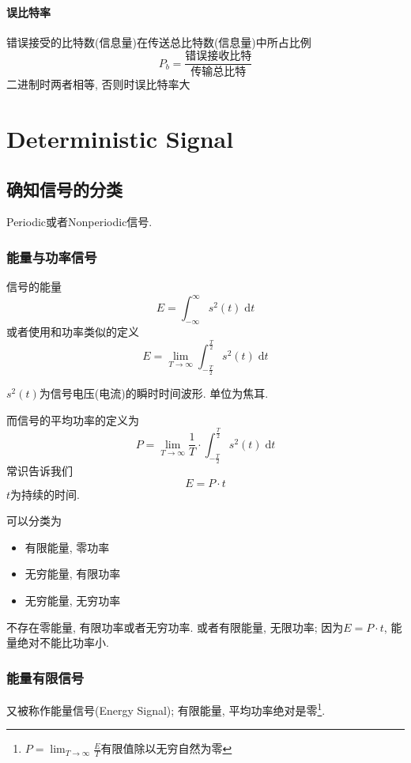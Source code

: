 \documentclass[a4paper]{report}
\begin{document}
\subsubsection{误比特率}
错误接受的比特数(信息量)在传送总比特数(信息量)中所占比例
\begin{equation}
  P_b=\frac{\text{错误接收比特}}{\text{传输总比特}}
\end{equation}
二进制时两者相等, 否则时误比特率大
\chapter{Deterministic Signal}

\section{确知信号的分类}
Periodic或者Nonperiodic信号. 

\subsection{能量与功率信号}
信号的能量
\begin{equation}
  E=\int_{-\infty}^\infty s^2(t)\;\text{d}t
\end{equation}
或者使用和功率类似的定义
\begin{equation}
  E=\lim_{T\rightarrow \infty}\int_{-\frac{T}{2}}^{\frac{T}{2}} s^2(t)\;\text{d}t
\end{equation}

$s^2(t)$为信号电压(电流)的瞬时时间波形. 单位为焦耳. 

而信号的平均功率的定义为
\begin{equation}
  P=\lim_{T\rightarrow \infty}\frac{1}{T}\cdot\int_{-\frac{T}{2}}^{\frac{T}{2}} s^2(t)\;\text{d}t
\end{equation}
常识告诉我们
\begin{equation}
  E=P\cdot t
\end{equation}
$t$为持续的时间. 

可以分类为
\begin{itemize}
  \item 有限能量, 零功率
  \item 无穷能量, 有限功率
  \item 无穷能量, 无穷功率
\end{itemize}
不存在零能量, 有限功率或者无穷功率. 或者有限能量, 无限功率; 因为$E=P\cdot t$, 能量绝对不能比功率小. 
\subsection{能量有限信号}
又被称作能量信号(Energy Signal); 有限能量, 平均功率绝对是零\footnote{$P=\displaystyle\lim_{T\rightarrow \infty}\frac{E}{T}$有限值除以无穷自然为零}. 
\end{document}
